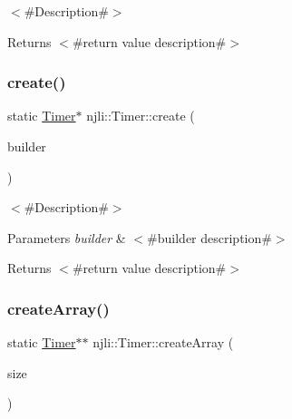 $<$\#\+Description\#$>$

\begin{DoxyReturn}{Returns}
$<$\#return value description\#$>$ 
\end{DoxyReturn}
\mbox{\label{classnjli_1_1_timer_a7034ba015773d310f422673a84b868fc}} 
\subsubsection{\texorpdfstring{create()}{create()}\hspace{0.1cm}{\footnotesize\ttfamily [3/3]}}
{\footnotesize\ttfamily static \mbox{\hyperlink{classnjli_1_1_timer}{Timer}}$\ast$ njli\+::\+Timer\+::create (\begin{DoxyParamCaption}\item[{const \mbox{\hyperlink{classnjli_1_1_timer_builder}{Timer\+Builder}} \&}]{builder }\end{DoxyParamCaption})\hspace{0.3cm}{\ttfamily [static]}}

$<$\#\+Description\#$>$


\begin{DoxyParams}{Parameters}
{\em builder} & $<$\#builder description\#$>$\\
\hline
\end{DoxyParams}
\begin{DoxyReturn}{Returns}
$<$\#return value description\#$>$ 
\end{DoxyReturn}
\mbox{\label{classnjli_1_1_timer_a81575fdeccaa12739eab0ed19d82af6a}} 
\subsubsection{\texorpdfstring{create\+Array()}{createArray()}}
{\footnotesize\ttfamily static \mbox{\hyperlink{classnjli_1_1_timer}{Timer}}$\ast$$\ast$ njli\+::\+Timer\+::create\+Array (\begin{DoxyParamCaption}\item[{const \mbox{\hyperlink{_util_8h_a10e94b422ef0c20dcdec20d31a1f5049}{u32}}}]{size }\end{DoxyParamCaption})\hspace{0.3cm}{\ttfamily [static]}}

